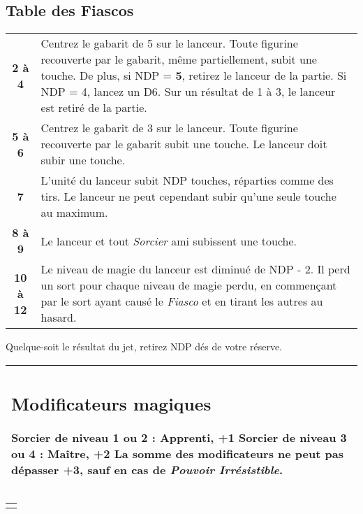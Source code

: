 \documentclass[a4paper,8pt]{extarticle}
\newcommand{\pouce}{\arcsecond}
\begin{document}
\begin{minipage}[t]{.5\linewidth}
\fontsize{10}{10}\selectfont

\subsection*{Table des Fiascos}

\begin{tabular}{cm{6.8cm}}
\hline
\textbf{2 à 4} & Centrez le gabarit de \unit{5}{\pouce} sur le lanceur. Toute figurine recouverte par le gabarit, même partiellement, subit une touche. De plus, si NDP = \textbf{5}, retirez le lanceur de la partie. Si NDP = 4, lancez un D6. Sur un résultat de 1 à 3, le lanceur est retiré de la partie. \tabularnewline
\textbf{5 à 6} & Centrez le gabarit de \unit{3}{\pouce} sur le lanceur. Toute figurine recouverte par le gabarit subit une touche. Le lanceur doit subir une touche. \tabularnewline
\textbf{7} & L'unité du lanceur subit NDP touches, réparties comme des tirs. Le lanceur ne peut cependant subir qu'une seule touche au maximum. \tabularnewline
\textbf{8 à 9} & Le lanceur et tout \emph{Sorcier} ami subissent une touche. \tabularnewline
\textbf{10 à 12} & Le niveau de magie du lanceur est diminué de NDP - 2. Il perd un sort pour chaque niveau de magie perdu, en commençant par le sort ayant causé le \emph{Fiasco} et en tirant les autres au hasard. \tabularnewline
\hline
\end{tabular}

\bigskip
Quelque-soit le résultat du jet, retirez NDP dés de votre réserve.
\bigskip

\begin{tabular}{|m{8cm}|}
\hline
\vspace*{-0.4cm}
\subsection*{Modificateurs magiques}
\noindent Sorcier de niveau 1 ou 2 : Apprenti, +1
\newline Sorcier de niveau 3 ou 4 : Maître, +2
\newline La somme des modificateurs ne peut pas dépasser +3, sauf en cas de \emph{Pouvoir Irrésistible}. \tabularnewline
\hline
\end{tabular}

\bigskip

\begin{tabular}{|m{8cm}|}
\hline
\vspace*{-0.4cm}

\end{tabular}
\end{minipage}
\end{document}
